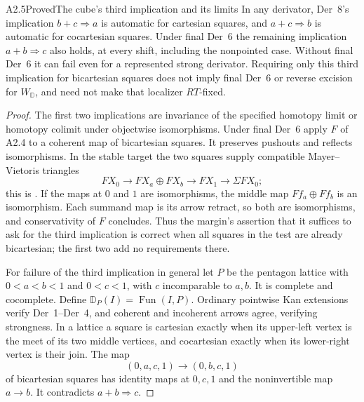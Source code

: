 \begin{claim}{A2.5}{Proved}{The cube's third implication and its limits}
\label{A2-Der8}
In any derivator, Der~8's implication $b+c\Rightarrow a$ is automatic for
cartesian squares, and $a+c\Rightarrow b$ is automatic for cocartesian
squares. Under final Der~6 the remaining implication $a+b\Rightarrow c$
also holds, at every shift, including the nonpointed case. Without final
Der~6 it can fail even for a represented strong derivator. Requiring only
this third implication for bicartesian squares does not imply final Der~6
or reverse excision for $W_{\mathbb D}$, and need not make that localizer
$RT$-fixed.
\end{claim}
\begin{proof}
The first two implications are invariance of the specified homotopy limit
or homotopy colimit under objectwise isomorphisms. Under final Der~6 apply
$F$ of A2.4 to a coherent map of bicartesian squares. It preserves
pushouts and reflects isomorphisms. In the stable target the two squares
supply compatible Mayer--Vietoris triangles
\[
 FX_0\longrightarrow FX_a\oplus FX_b\longrightarrow FX_1
                    \longrightarrow\Sigma FX_0;
\]
this is \cite[Theorem~6.1]{A2GrothPontoShulman}. If the maps at $0$ and $1$
are isomorphisms, the middle map $Ff_a\oplus Ff_b$ is an isomorphism.
Each summand map is its arrow retract, so both are isomorphisms, and
conservativity of $F$ concludes. Thus the margin's assertion that it suffices
to ask for the third implication is correct when all squares in the test
are already bicartesian; the first two add no requirements there.

For failure of the third implication in general let $P$ be the pentagon
lattice with $0<a<b<1$ and $0<c<1$, with $c$ incomparable to $a,b$.
It is complete and cocomplete. Define $\mathbb D_P(I)=\operatorname{Fun}(I,P)$.
Ordinary pointwise Kan extensions verify Der~1--Der~4, and coherent and
incoherent arrows agree, verifying strongness. In a lattice a square is
cartesian exactly when its upper-left vertex is the meet of its two middle
vertices, and cocartesian exactly when its lower-right vertex is their join.
The map
\[
 (0,a,c,1)\longrightarrow(0,b,c,1)
 \tag{A2.5.1}
\]
of bicartesian squares has identity maps at $0,c,1$ and the noninvertible
map $a\to b$. It contradicts $a+b\Rightarrow c$.


\end{proof}
